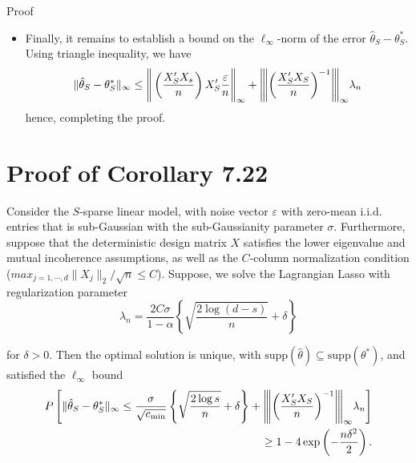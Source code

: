 \documentclass[10pt,handout,english]{beamer}
\newcommand{\vertiii}[1]{{\left\vert\kern-0.25ex\left\vert\kern-0.25ex\left\vert #1 
    \right\vert\kern-0.25ex\right\vert\kern-0.25ex\right\vert}}
\begin{document}
\begin{frame}[allowframebreaks]{Proof}
\begin{itemize}
\item Finally, it remains to establish a bound on the $\ell_{\infty}$-norm of the error $\hat{\theta}_S-\theta_S^*$. Using triangle inequality, we have\justifying
\[
\lVert\hat{\theta}_S-\theta_{S}^*\rVert_{\infty}\leq \Bigg\lVert \left(\frac{X_S'X_s}{n}\right)X_S'\frac{\varepsilon}{n}\Bigg\rVert_{\infty}+\vertiii{\left(\frac{X_S'X_S}{n}\right)^{-1}}_{\infty}\lambda_n
\] 
hence, completing the proof.
\end{itemize}
\end{frame}


\section{Proof of Corollary 7.22}

\begin{frame}
\begin{corollary}
Consider the $S$-sparse linear model, with noise vector $\varepsilon$ with zero-mean i.i.d. entries that is sub-Gaussian with the sub-Gaussianity parameter $\sigma$. Furthermore, suppose that the deterministic design matrix $X$ satisfies the lower eigenvalue and mutual incoherence assumptions, as well as the $C$-column normalization condition ($max_{j=1,\cdots,d}\lVert X_j\rVert_2/\sqrt{n}\leq C$). Suppose, we solve the Lagrangian Lasso with regularization parameter\justifying 
\begin{equation}\label{eq: lambdacorol}
\lambda_n=\frac{2C\sigma}{1-\alpha}\left\{\sqrt{\frac{2\log (d-s)}{n}}+\delta\right\}
\end{equation}

for $\delta>0$. Then the optimal solution is unique, with $\text{supp}(\hat{\theta})\subseteq\text{supp}(\theta^*)$, and satisfied the $\ell_{\infty}$ bound
\begin{align*}
P\left[\lVert\hat{\theta}_S-\theta_S^*\rVert_{\infty}\leq \frac{\sigma}{\sqrt{c_{\min}}}\left\{\sqrt{\frac{2\log s}{n}}+\delta\right\}+\vertiii{\left(\frac{X_S'X_S}{n}\right)^{-1}}_{\infty}\lambda_n\right]\\\geq 1-4\exp\left(-\frac{n\delta^2}{2}\right).
\end{align*}
\end{corollary}
\end{frame}
\end{document}
